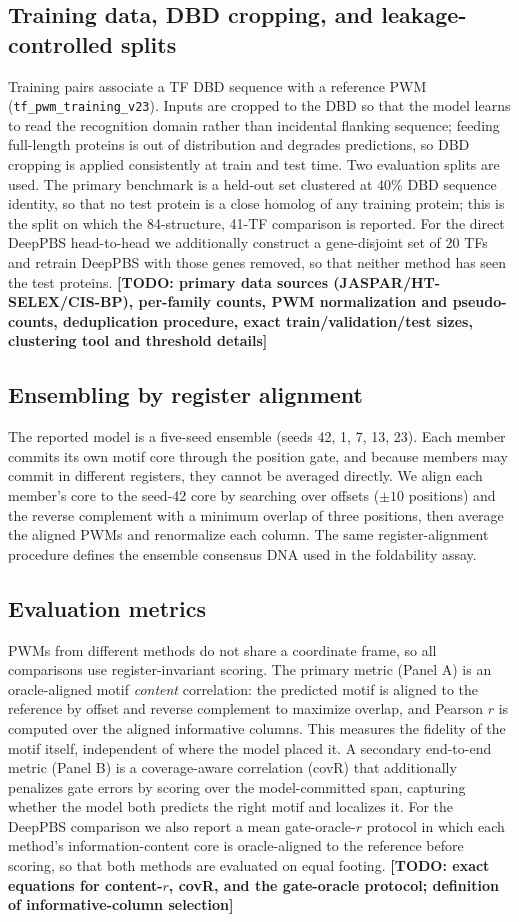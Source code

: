 \documentclass[11pt]{article}
\newcommand{\TODO}[1]{{\color{red}\textbf{[TODO: #1]}}}
\begin{document}
\subsection*{Training data, DBD cropping, and leakage-controlled splits}
Training pairs associate a TF DBD sequence with a reference PWM
(\texttt{tf\_pwm\_training\_v23}). Inputs are cropped to the DBD so that the model
learns to read the recognition domain rather than incidental flanking sequence; feeding
full-length proteins is out of distribution and degrades predictions, so DBD cropping is
applied consistently at train and test time. Two evaluation splits are used. The primary
benchmark is a held-out set clustered at 40\% DBD sequence identity, so that no test
protein is a close homolog of any training protein; this is the split on which the
84-structure, 41-TF comparison is reported. For the direct DeepPBS head-to-head we
additionally construct a gene-disjoint set of 20 TFs and retrain DeepPBS with those
genes removed, so that neither method has seen the test proteins.
\TODO{primary data sources (JASPAR/HT-SELEX/CIS-BP), per-family counts, PWM
normalization and pseudo-counts, deduplication procedure, exact train/validation/test
sizes, clustering tool and threshold details}

\subsection*{Ensembling by register alignment}
The reported model is a five-seed ensemble (seeds 42, 1, 7, 13, 23). Each member commits
its own motif core through the position gate, and because members may commit in
different registers, they cannot be averaged directly. We align each member's core to
the seed-42 core by searching over offsets ($\pm10$ positions) and the reverse
complement with a minimum overlap of three positions, then average the aligned PWMs and
renormalize each column. The same register-alignment procedure defines the ensemble
consensus DNA used in the foldability assay.

\subsection*{Evaluation metrics}
PWMs from different methods do not share a coordinate frame, so all comparisons use
register-invariant scoring. The primary metric (Panel A) is an oracle-aligned motif
\emph{content} correlation: the predicted motif is aligned to the reference by offset
and reverse complement to maximize overlap, and Pearson $r$ is computed over the aligned
informative columns. This measures the fidelity of the motif itself, independent of
where the model placed it. A secondary end-to-end metric (Panel B) is a coverage-aware
correlation (covR) that additionally penalizes gate errors by scoring over the
model-committed span, capturing whether the model both predicts the right motif and
localizes it. For the DeepPBS comparison we also report a mean gate-oracle-$r$ protocol
in which each method's information-content core is oracle-aligned to the reference before
scoring, so that both methods are evaluated on equal footing.
\TODO{exact equations for content-$r$, covR, and the gate-oracle protocol; definition of
informative-column selection}
\end{document}
